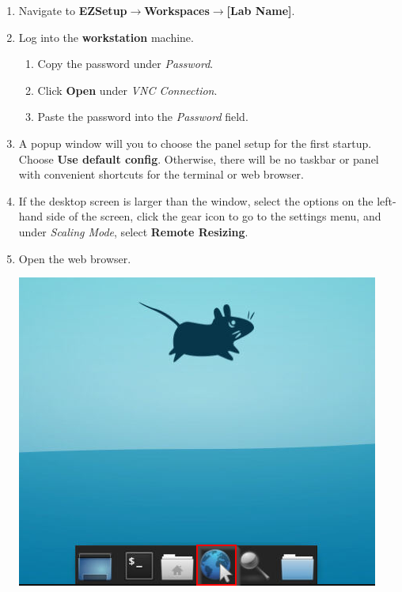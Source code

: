 \documentclass[letterpaper, 12pt]{article}
\begin{document}
\begin{enumerate}
    \item Navigate to \textbf{EZSetup$\rightarrow$Workspaces$\rightarrow$[Lab Name]}.
    
    \item Log into the \textbf{workstation} machine.
    \begin{enumerate}
        \item Copy the password under \textit{Password}.
        \item Click \textbf{Open} under \textit{VNC Connection}.
        \item Paste the password into the \textit{Password} field.
    \end{enumerate}

    \item A popup window will you to choose the panel setup for the first startup. Choose \textbf{Use default config}.
    Otherwise, there will be no taskbar or panel with convenient shortcuts for the terminal or web browser.

    \item If the desktop screen is larger than the window, select the options on the left-hand side of the screen,
    click the gear icon to go to the settings menu, and under \textit{Scaling Mode}, select \textbf{Remote Resizing}.

    \item Open the web browser.

    \begin{center}
    \includegraphics[scale=0.75]{images/part_1_step_5.png}
    \end{center}


\end{enumerate}
\end{document}
